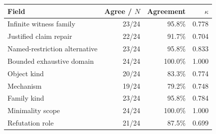 \begin{tabular}{lrrr}
\toprule
Field & Agree / $N$ & Agreement & $\kappa$ \\
\midrule
Infinite witness family & 23/24 & 95.8\% & 0.778 \\
Justified claim repair & 22/24 & 91.7\% & 0.704 \\
Named-restriction alternative & 23/24 & 95.8\% & 0.833 \\
Bounded exhaustive domain & 24/24 & 100.0\% & 1.000 \\
Object kind & 20/24 & 83.3\% & 0.774 \\
Mechanism & 19/24 & 79.2\% & 0.748 \\
Family kind & 23/24 & 95.8\% & 0.784 \\
Minimality scope & 24/24 & 100.0\% & 1.000 \\
Refutation role & 21/24 & 87.5\% & 0.699 \\
\bottomrule
\end{tabular}
